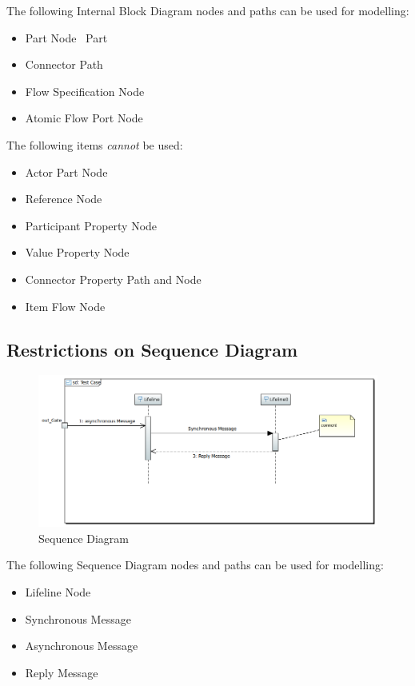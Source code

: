 The following Internal Block Diagram nodes and paths can be used for
modelling:
\begin{itemize}
\item Part Node ~\textsf{Part}
\item Connector Path 
\item Flow Specification Node 
\item Atomic Flow Port Node     
\end{itemize}

The following items \emph{cannot} be used:
\begin{itemize}
\item Actor Part Node
\item Reference Node
\item Participant Property Node
\item Value Property Node
\item Connector Property Path and Node
\item Item Flow Node
\end{itemize}

\subsection{Restrictions on Sequence Diagram}



\begin{figure}[ht]
  \centering
  \includegraphics[width=\textwidth]{images/SequenceDiagram.PNG}
  \caption{Sequence Diagram}
  \label{fig:sd}
\end{figure}


The following Sequence Diagram nodes and paths can be used for
modelling:
\begin{itemize}
\item Lifeline Node 
\item Synchronous Message 
\item Asynchronous Message 
\item Reply Message 
\end{itemize}

